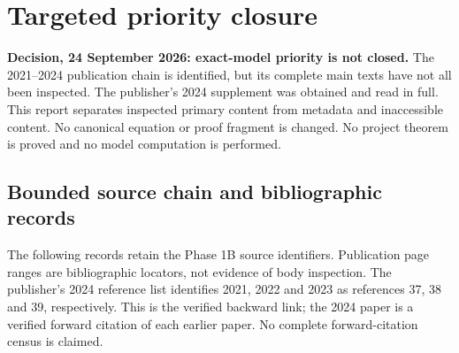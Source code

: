 \section{Targeted priority closure}
\label{sec:priority-closure}
\textbf{Decision, 24 September 2026: exact-model priority is not closed.}
The 2021--2024 publication chain is identified, but its complete main texts
have not all been inspected. The publisher's 2024 supplement was obtained and
read in full. This report separates inspected primary content from metadata
and inaccessible content. No canonical equation or proof fragment is changed.
No project theorem is proved and no model computation is performed.

\subsection{Bounded source chain and bibliographic records}
The following records retain the Phase 1B source identifiers. Publication
page ranges are bibliographic locators, not evidence of body inspection.
The publisher's 2024 reference list identifies 2021, 2022 and 2023 as
references 37, 38 and 39, respectively. This is the verified backward link;
the 2024 paper is a verified forward citation of each earlier paper. No
complete forward-citation census is claimed.
